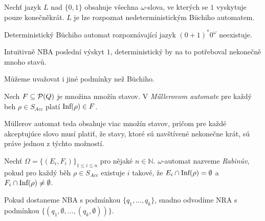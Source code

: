 \begin{example}
    Nechť jazyk $L$ nad $\{0,1\}$ obsahuje všechna $\omega$-slova, ve
    kterých se $1$ vyskytuje pouze konečněkrát.
    $L$ je lze rozpoznat nedeterministickým Büchiho automatem.

\begin{center}
\end{center}
\end{example}

\begin{claim}
    Deterministický Büchiho automat rozpoznávající jazyk
    $(0+1)^*0^\omega$ neexistuje.
\end{claim}

Intuitivně NBA  poslední výskyt $1$,
deterministický by na to potřeboval nekonečně mnoho stavů.

Můžeme uvažovat i jiné podmínky než Büchiho.

\begin{definition}
    Nech $F \subseteq \mathcal{P}(Q)$ je množina množín stavov.
	V {\em Műllerovom automate} pre každý beh $\rho \in S_{Acc}$ platí
    $\text{Inf}(\rho) \in F$.
\end{definition}

Müllerov automat teda obsahuje viac množín stavov, pričom
pre každé akceptujúce slovo musí platiť, že stavy, ktoré 
sú navštívené nekonečne krát, sú práve jednou z týchto možností.

\begin{definition}
    Nechť $\Omega = \{(E_i, F_i)\}_{1 \leq i \leq n}$ pro nějaké
    $n \in \mathbb{N}$.
    $\omega$-automat nazveme {\em Rabinův},
    pokud pro každý běh $\rho \in S_{Acc}$
    existuje $i$ takové, že \linebreak
    $E_i \cap \text{Inf}(\rho) = \emptyset$
    a
    $F_i \cap \text{Inf}(\rho) \neq \emptyset$.
\end{definition}

Pokud dostaneme NBA s podmínkou $\{q_1, \ldots, q_k\}$,
snadno odvodíme NRA s podmínkou $\{(q_1, \emptyset, \ldots, (q_k, \emptyset))\}$.

\begin{example}
\end{example}

